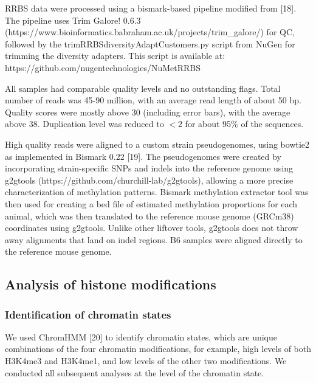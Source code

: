 \documentclass[10pt,letterpaper]{article}
\begin{document}
RRBS data were processed using a bismark-based pipeline modified from
{[}18{]}. The pipeline uses Trim Galore! 0.6.3
(https://www.bioinformatics.babraham.ac.uk/projects/trim\_galore/) for
QC, followed by the trimRRBSdiversityAdaptCustomers.py script from NuGen
for trimming the diversity adapters. This script is available at:
https://github.com/nugentechnologies/NuMetRRBS

All samples had comparable quality levels and no outstanding flags.
Total number of reads was 45-90 million, with an average read length of
about 50 bp. Quality scores were mostly above 30 (including error bars),
with the average above 38. Duplication level was reduced to \(<2\) for
about 95\% of the sequences.

High quality reads were aligned to a custom strain pseudogenomes, using
bowtie2 as implemented in Bismark 0.22 {[}19{]}. The pseudogenomes were
created by incorporating strain-specific SNPs and indels into the
reference genome using g2gtools
(https://github.com/churchill-lab/g2gtools), allowing a more precise
characterization of methylation patterns. Bismark methylation extractor
tool was then used for creating a bed file of estimated methylation
proportions for each animal, which was then translated to the reference
mouse genome (GRCm38) coordinates using g2gtools. Unlike other liftover
tools, g2gtools does not throw away alignments that land on indel
regions. B6 samples were aligned directly to the reference mouse genome.

\hypertarget{analysis-of-histone-modifications}{%
\subsection{Analysis of histone
modifications}\label{analysis-of-histone-modifications}}

\hypertarget{identification-of-chromatin-states}{%
\subsubsection{Identification of chromatin
states}\label{identification-of-chromatin-states}}

We used ChromHMM {[}20{]} to identify chromatin states, which are unique
combinations of the four chromatin modifications, for example, high
levels of both H3K4me3 and H3K4me1, and low levels of the other two
modifications. We conducted all subsequent analyses at the level of the
chromatin state.
\end{document}
